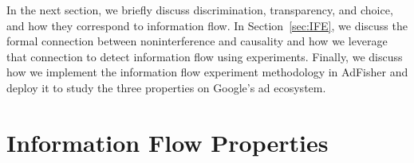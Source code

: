 \documentclass[10pt, onecolumn]{report}
\begin{document}

In the next section, we briefly discuss discrimination, transparency, and choice, 
and how they correspond to information flow. In Section~\ref{sec:IFE}, we discuss
the formal connection between noninterference and causality and how we leverage that
connection to detect information flow using experiments. Finally, we discuss 
how we implement the information flow experiment methodology in AdFisher and deploy 
it to study the three properties on Google's ad ecosystem. 

\section{Information Flow Properties}

\end{document}
